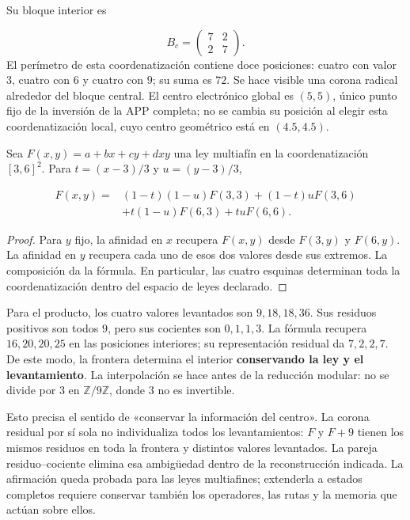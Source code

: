 Su bloque interior es

\[
B_c=\begin{pmatrix}7&2\\2&7\end{pmatrix}.
\]
El perímetro de esta coordenatización contiene doce posiciones: cuatro con valor \(3\), cuatro con \(6\) y cuatro con \(9\); su suma es \(72\). Se hace visible una corona radical alrededor del bloque central. El centro electrónico global es \((5,5)\), único punto fijo de la inversión de la APP completa; no se cambia su posición al elegir esta coordenatización local, cuyo centro geométrico está en \((4.5,4.5)\).

\begin{proposition}
\label{prop:centro-frontera-recuperacion}
Sea \(F(x,y)=a+bx+cy+dxy\) una ley multiafín en la coordenatización \([3,6]^2\). Para \(t=(x-3)/3\) y \(u=(y-3)/3\),

\[
\begin{aligned}
F(x,y)={}&(1-t)(1-u)F(3,3)+(1-t)uF(3,6)\\
&+t(1-u)F(6,3)+tuF(6,6).
\end{aligned}
\]
\end{proposition}
\begin{proof}
Para \(y\) fijo, la afinidad en \(x\) recupera \(F(x,y)\) desde \(F(3,y)\) y \(F(6,y)\). La afinidad en \(y\) recupera cada uno de esos dos valores desde sus extremos. La composición da la fórmula. En particular, las cuatro esquinas determinan toda la coordenatización dentro del espacio de leyes declarado.
\end{proof}

Para el producto, los cuatro valores levantados son \(9,18,18,36\). Sus residuos positivos son todos \(9\), pero sus cocientes son \(0,1,1,3\). La fórmula recupera \(16,20,20,25\) en las posiciones interiores; su representación residual da \(7,2,2,7\). De este modo, la frontera determina el interior \textbf{conservando la ley y el levantamiento}. La interpolación se hace antes de la reducción modular: no se divide por \(3\) en \(\mathbb Z/9\mathbb Z\), donde \(3\) no es invertible.

Esto precisa el sentido de «conservar la información del centro». La corona residual por sí sola no individualiza todos los levantamientos: \(F\) y \(F+9\) tienen los mismos residuos en toda la frontera y distintos valores levantados. La pareja residuo–cociente elimina esa ambigüedad dentro de la reconstrucción indicada. La afirmación queda probada para las leyes multiafines; extenderla a estados completos requiere conservar también los operadores, las rutas y la memoria que actúan sobre ellos.

